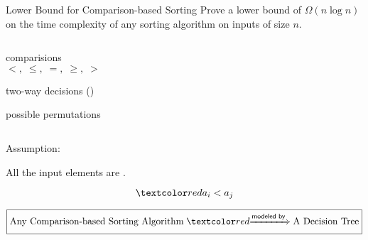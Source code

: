 
\begin{frame}{}
  \begin{exampleblock}{Lower Bound for Comparison-based Sorting}
    Prove a lower bound of $\Omega(n \log n)$
    on the time complexity of any  sorting 
    algorithm on inputs of size $n$.
  \end{exampleblock}

  \pause
  \vspace{0.30cm}
  \begin{columns}
  \end{columns}
\end{frame}

\begin{frame}{}
  \begin{center}
    {\Large {}} 

    \pause
    \vspace{0.20cm}
    \begin{columns}
	\begin{description}[Leaves:]
	  \item[Nodes:] comparisions 
	    \[
	      <,\; \le,\; =,\; \ge,\; >
	    \]
	  \item[Edges:] two-way decisions ()
	  \item[Leaves:] possible permutations
	\end{description}
    \end{columns}

    \pause
    \vspace{0.60cm}
    \begin{alertblock}{Assumption:}
      \centerline{All the input elements are .}
      \[
		\red{a_i < a_j}
      \]
    \end{alertblock}
  \end{center}
\end{frame}

\begin{frame}{}
  \begin{center}
    {\Large {}} 
  \end{center}

  \vspace{-0.40cm}
  \[
    \boxed{\text{Any Comparison-based Sorting Algorithm} \;\red{\xRightarrow{ \textsf{modeled by} }}\; \text{A Decision Tree}}
  \]

  \pause
\end{frame}

